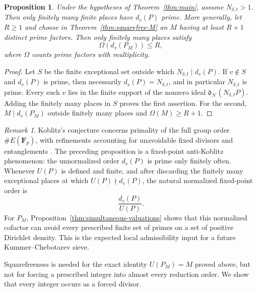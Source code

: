 \documentclass[11pt,letterpaper,reqno]{amsart}
\newtheorem{proposition}[theorem]{Proposition}
\theoremstyle{definition}
\theoremstyle{remark}
\newtheorem{remark}[theorem]{Remark}
\newcommand{\F}{\mathbf F}
\newcommand{\dd}{\mathfrak d}
\newcommand{\Ner}{\mathcal N}
\begin{document}
\begin{proposition}
\label{prop:anti-koblitz}
Under the hypotheses of Theorem~\ref{thm:main}, assume $N_{\delta,t}>1$.  Then only
finitely many finite places have
$d_v(P)$ prime.  More generally, let $R\ge1$ and choose in
Theorem~\ref{thm:squarefree-M} an $M$ having at least $R+1$ distinct prime factors.
Then only finitely many places satisfy
\[
 \Omega(d_v(P_M))\le R,
\]
where $\Omega$ counts prime factors with multiplicity.
\end{proposition}

\begin{proof}
Let $S$ be the finite exceptional set outside which
$N_{\delta,t}\mid d_v(P)$.  If $v\notin S$ and $d_v(P)$ is prime, then
necessarily $d_v(P)=N_{\delta,t}$, and in particular $N_{\delta,t}$ is prime.
Every such $v$ lies in the finite support of the nonzero ideal
$\dd_{\Ner}(N_{\delta,t}P)$.  Adding the finitely many places in $S$ proves the
first assertion.  For the second, $M\mid d_v(P_M)$ outside finitely many places
and $\Omega(M)\ge R+1$.
\end{proof}

\begin{remark}
Koblitz's conjecture concerns primality of the full group order
$\#E(\F_p)$, with refinements accounting for unavoidable fixed divisors and
entanglements \cite{Koblitz1988,Zywina2011}.  The preceding proposition is a
fixed-point anti-Koblitz phenomenon: the unnormalized order $d_v(P)$ is
prime only finitely often.  Whenever $U(P)$ is defined and finite, and after
discarding the finitely many exceptional places at which
$U(P)\nmid d_v(P)$, the natural normalized fixed-point order is
\[
 \frac{d_v(P)}{U(P)}.
\]
For $P_M$, Proposition~\ref{thm:simultaneous-valuations} shows that this normalized
cofactor can avoid every prescribed finite set of primes on a set of positive
Dirichlet density.  This is the expected local admissibility input for a future
Kummer--Chebotarev sieve.
\end{remark}

Squarefreeness is needed for the exact identity $U(P_M)=M$ proved above, but
not for forcing a prescribed integer into almost every reduction order. We show that every integer occurs as a forced divisor.
\end{document}

